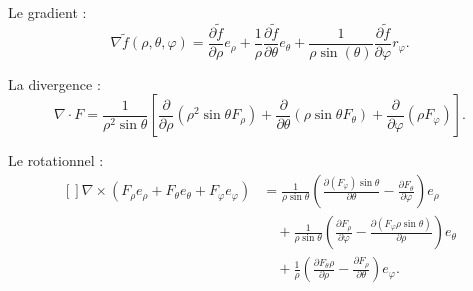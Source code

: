 Le gradient :
\begin{equation}
	\nabla\tilde f(\rho,\theta,\varphi)=\frac{ \partial \tilde f }{ \partial \rho }e_{\rho}+\frac{1}{ \rho }\frac{ \partial \tilde f }{ \partial \theta }e_{\theta}+\frac{1}{ \rho\sin(\theta) }\frac{ \partial \tilde f }{ \partial \varphi }r_{\varphi}.
\end{equation}


La divergence :
\begin{equation}
	\nabla\cdot F=\frac{1}{ \rho^2\sin\theta }\left[ \frac{ \partial  }{ \partial \rho }(\rho^2\sin\theta F_{\rho})+\frac{ \partial  }{ \partial \theta }(\rho\sin\theta F_{\theta})+\frac{ \partial  }{ \partial \varphi }(\rho F_{\varphi}) \right].
\end{equation}

Le rotationnel :
\begin{equation}
	\begin{aligned}[]
		\nabla\times(F_{\rho}e_{\rho}+F_{\theta}e_{\theta}+F_{\varphi}e_{\varphi}) & =\frac{1}{ \rho\sin\theta }\left( \frac{ \partial (F_{\varphi})\sin\theta }{ \partial \theta }-\frac{ \partial F_{\theta} }{ \partial \varphi } \right)e_{\rho}        \\
		                                                                           & \quad+\frac{1}{ \rho\sin\theta }\left( \frac{ \partial F_{\rho} }{ \partial \varphi }-\frac{ \partial (F_{\varphi}\rho\sin\theta) }{ \partial \rho } \right)e_{\theta} \\
		                                                                           & \quad+\frac{1}{ \rho }\left( \frac{ \partial F_{\theta}\rho }{ \partial \rho }-\frac{ \partial F_{\rho} }{ \partial \theta } \right)e_{\varphi}.
	\end{aligned}
\end{equation}
